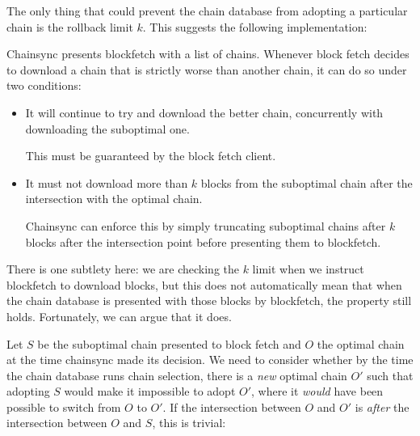 The only thing that could prevent the chain database from adopting a particular
chain is the rollback limit $k$. This suggests the following implementation:

\begin{definition}
Chainsync presents blockfetch with a list of chains. Whenever block fetch
decides to download a chain that is strictly worse than another chain,
it can do so under two conditions:

\begin{itemize}
\item It will continue to try and download the better chain, concurrently
with downloading the suboptimal one.

This must be guaranteed by the block fetch client.
\item It must not download more than $k$ blocks from the suboptimal chain after
the intersection with the optimal chain.

Chainsync can enforce this by simply truncating suboptimal chains after $k$
blocks after the intersection point before presenting them to blockfetch.
\end{itemize}
\end{definition}

There is one subtlety here: we are checking the $k$ limit when we instruct
blockfetch to download blocks, but this does not automatically mean that when
the chain database is presented with those blocks by blockfetch, the property
still holds. Fortunately, we can argue that it does.

Let $S$ be the suboptimal chain presented to block fetch and $O$ the optimal
chain at the time chainsync made its decision. We need to consider whether by
the time the chain database runs chain selection, there is a \emph{new} optimal
chain $O'$ such that adopting $S$ would make it impossible to adopt $O'$, where
it \emph{would} have been possible to switch from $O$ to $O'$. If the
intersection between $O$ and $O'$ is \emph{after} the intersection between $O$
and $S$, this is trivial:

\begin{center}
\end{center}


